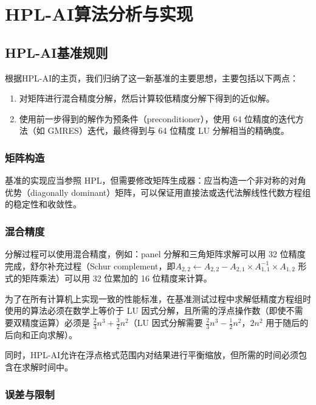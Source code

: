 \chapter{HPL-AI算法分析与实现}

\label{HPL-AI算法分析与实现}

\section{HPL-AI基准规则}

根据HPL-AI的主页\cite{dongarrahpl}，我们归纳了这一新基准的主要思想，主要包括以下两点：

\begin{enumerate}
    \item 对矩阵进行混合精度分解，然后计算较低精度分解下得到的近似解。
    \item 使用前一步得到的解作为预条件（preconditioner），使用 64 位精度的迭代方法（如 GMRES）迭代，最终得到与 64 位精度 LU 分解相当的精确度。
\end{enumerate}

\subsection{矩阵构造}

基准的实现应当参照 HPL，但需要修改矩阵生成器：应当构造一个非对称的对角优势（diagonally dominant）矩阵，可以保证用直接法或迭代法解线性代数方程组的稳定性和收敛性。

\subsection{混合精度}

分解过程可以使用混合精度，例如：panel 分解和三角矩阵求解可以用 32 位精度完成，舒尔补充过程（Schur complement，即$A_{2,2} \leftarrow A_{2,2} - A_{2,1} \times A_{1,1}^{-1} \times A_{1,2}$ 形式的矩阵乘法）可以用 32 位累加的 16 位精度来计算。

为了在所有计算机上实现一致的性能标准，在基准测试过程中求解低精度方程组时使用的算法必须在数学上等价于 LU 因式分解，且所需的浮点操作数（即使不需要双精度运算）必须是 $\frac{2}{3} n^3 + \frac{3}{2} n^2$（LU 因式分解需要 $\frac{2}{3} n^3 - \frac{1}{2} n^2$，$2n^2$ 用于随后的后向和正向求解）。

同时，HPL-AI允许在浮点格式范围内对结果进行平衡缩放，但所需的时间必须包含在求解时间中。

\subsection{误差与限制}

